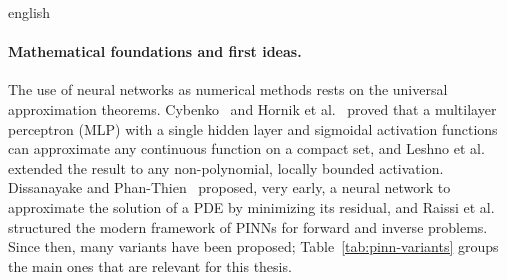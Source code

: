 \documentclass[0000.tex]{subfiles}
\begin{document}
\begin{hyphenrules}{english}
\paragraph{Mathematical foundations and first ideas.}
The use of neural networks as numerical methods rests on the universal approximation theorems.
Cybenko~\cite{cybenko1989} and Hornik et al.~\cite{hornik1989} proved that a multilayer perceptron (MLP) with a single
hidden layer and sigmoidal activation functions can approximate any continuous function on a compact
set, and Leshno et al.~\cite{leshno1993} extended the result to any non-polynomial, locally bounded activation.
Dissanayake and Phan-Thien~\cite{dissanayake1994} proposed, very early, a neural network to approximate the solution of a PDE
by minimizing its residual, and Raissi et al.~\cite{raissi2017a,raissi2017b,raissi2019} structured the modern
framework of PINNs for forward and inverse problems. Since then, many variants have been proposed;
Table~\ref{tab:pinn-variants} groups the main ones that are relevant for this thesis.


\end{hyphenrules}
\end{document}
